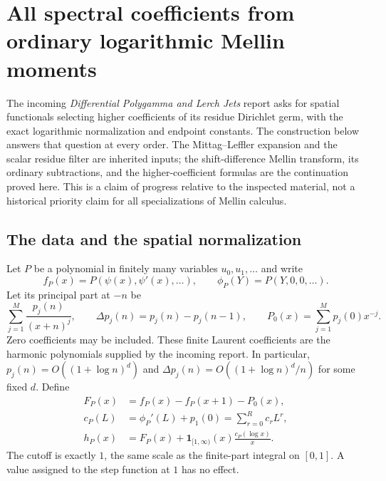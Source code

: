 \section{All spectral coefficients from ordinary logarithmic Mellin moments}
\label{mellin:section}

The incoming \emph{Differential Polygamma and Lerch Jets} report
\cite[Section~9]{incoming-differential} asks for
spatial functionals selecting higher coefficients of its residue Dirichlet
germ, with the exact logarithmic normalization and endpoint constants.
The construction below answers that question at every order.  The
Mittag--Leffler expansion and the scalar residue filter are inherited
inputs; the shift-difference Mellin transform, its ordinary subtractions,
and the higher-coefficient formulas are the continuation proved here.
This is a claim of progress relative to the inspected material, not a
historical priority claim for all specializations of Mellin calculus.

\subsection{The data and the spatial normalization}

Let $P$ be a polynomial in finitely many variables $u_0,u_1,\ldots$ and
write
\[
 f_P(x)=P(\psi(x),\psi'(x),\ldots),\qquad
 \phi_P(Y)=P(Y,0,0,\ldots).
\]
Let its principal part at $-n$ be
\[
 \sum_{j=1}^{M}\frac{p_j(n)}{(x+n)^j},\qquad
 \Delta p_j(n)=p_j(n)-p_j(n-1),\qquad
 P_0(x)=\sum_{j=1}^{M}p_j(0)x^{-j}.
\]
Zero coefficients may be included.  These finite Laurent coefficients
are the harmonic polynomials supplied by the incoming report.  In
particular, $p_j(n)=O((1+\log n)^d)$ and
$\Delta p_j(n)=O((1+\log n)^d/n)$ for some fixed $d$.
Define
\begin{align}
 F_P(x)&=f_P(x)-f_P(x+1)-P_0(x),\label{mellin:F}\\
 c_P(L)&=\phi_P'(L)+p_1(0)=\sum_{r=0}^{R}c_rL^r,\label{mellin:c}\\
 h_P(x)&=F_P(x)+\mathbf 1_{[1,\infty)}(x)\frac{c_P(\log x)}x.
 \label{mellin:h}
\end{align}
The cutoff is exactly $1$, the same scale as the finite-part integral
on $[0,1]$.  A value assigned to the step function at $1$ has no effect.

